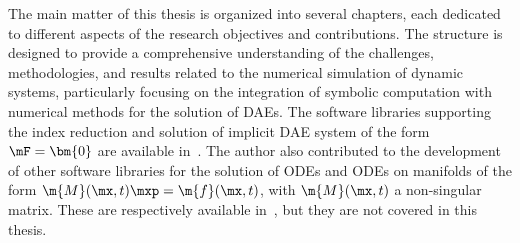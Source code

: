 The main matter of this thesis is organized into several chapters, each dedicated to different aspects of the research objectives and contributions. The structure is designed to provide a comprehensive understanding of the challenges, methodologies, and results related to the numerical simulation of dynamic systems, particularly focusing on the integration of symbolic computation with numerical methods for the solution of \acp{DAE}. The software libraries supporting the index reduction and solution of implicit \ac{DAE} system of the form $\mF = \bm{0}$ are available in~\cite{lem, last, indigo}. The author also contributed to the development of other software libraries for the solution of \acp{ODE} and \acp{ODE} on manifolds of the form $\m{M}(\mx, t)\mxp = \m{f}(\mx, t)$, with $\m{M}(\mx, t)$ a non-singular matrix. These are respectively available in~\cite{lime, limerickey}, but they are not covered in this thesis.
%
